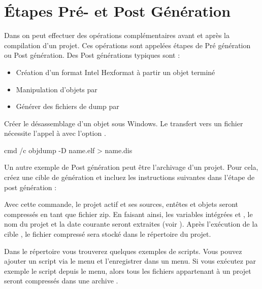 \section{Étapes Pré- et Post Génération}\label{sec:pre_postbuild}

Dans \codeblocks on peut effectuer des opérations complémentaires avant et après la compilation d'un projet. Ces opérations sont appelées étapes de Pré génération ou Post génération. Des Post générations typiques sont :

\begin{itemize}
\item Création d'un format Intel Hexformat à partir un objet terminé
\item Manipulation d'objets par 
\item Générer des fichiers de dump par 
\end{itemize}


Créer le désassemblage d'un objet sous Windows. Le transfert vers un fichier nécessite l'appel à  avec l'option .

\begin{cmd}
cmd /c objdump -D name.elf > name.dis
\end{cmd}

Un autre exemple de Post génération peut être l'archivage d'un projet. Pour cela, créez une cible de génération  et incluez les instructions suivantes dans l'étape de post génération :


Avec cette commande, le projet actif et ses sources, entêtes et objets seront compressés en tant que fichier zip. En faisant ainsi, les variables intégrées  et , le nom du projet et la date courante seront extraites (voir ). Après l'exécution de la cible , le fichier compressé sera stocké dans le répertoire du projet.

Dans le répertoire  vous trouverez quelques exemples de scripts. Vous pouvez ajouter un script via le menu  et l'enregistrer dans un menu. Si vous exécutez par exemple le  script  depuis le menu, alors tous les fichiers appartenant à un projet seront compressés dans une archive .

